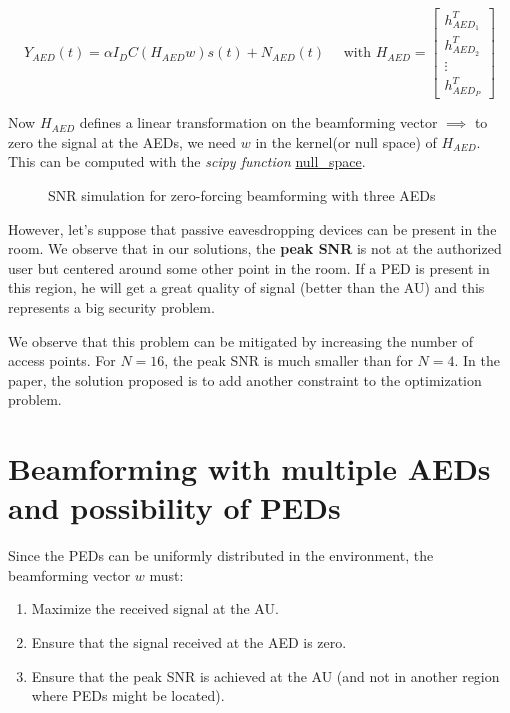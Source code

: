 \documentclass[a4paper,12pt,twoside]{article}
\begin{document}
	\begin{equation}
		Y_{AED}(t) = \alpha I_DC (H_{AED} w) s(t) + N_{AED}(t) \quad \text{ with } H_{AED} =
		\begin{bmatrix}
			h_{AED_1}^T \\
			h_{AED_2}^T \\
			\vdots \\
			h_{AED_P}^T
		\end{bmatrix} 
	\end{equation}
	
	Now $H_{AED}$ defines a linear transformation on the beamforming vector $\implies$ to zero the signal at the AEDs, we need $w$ in the kernel(or null space) of $H_{AED}$. This can be computed with the \textit{scipy function} \href{https://docs.scipy.org/doc/scipy/reference/generated/scipy.linalg.null_space.html}{null\_space}.
	
	\begin{figure}[h!]
		\centering
		\hfill
		\caption{SNR simulation for zero-forcing beamforming with three AEDs}
	\end{figure}
	
	However, let's suppose that passive eavesdropping devices can be present in the room. We observe that in our solutions, the \textbf{peak SNR} is not at the authorized user but centered around some other point in the room. If a PED is present in this region, he will get a great quality of signal (better than the AU) and this represents a big security problem.
	
	We observe that this problem can be mitigated by increasing the number of access points. For $N=16$, the peak SNR is much smaller than for $N = 4$. In the paper\cite{Oxford2021}, the solution proposed is to add another constraint to the optimization problem.
	
	\section{Beamforming with multiple AEDs and possibility of PEDs}
	
	Since the PEDs can be uniformly distributed in the environment, the beamforming vector \( w \) must:
	\begin{enumerate}
		\item Maximize the received signal at the AU.
		\item Ensure that the signal received at the AED is zero.
		\item Ensure that the peak SNR is achieved at the AU (and not in another region where PEDs might be located).
	\end{enumerate}
	
\end{document}
